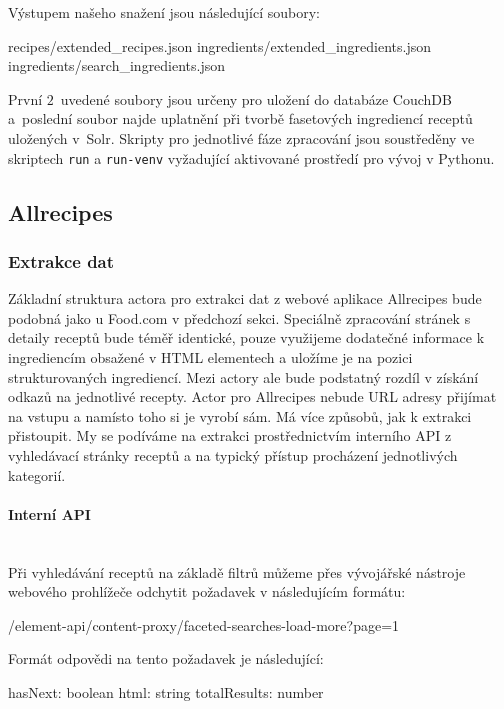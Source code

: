Výstupem našeho snažení jsou následující soubory:

\begin{code}
recipes/extended_recipes.json
ingredients/extended_ingredients.json
ingredients/search_ingredients.json
\end{code}

První $2$~uvedené soubory jsou určeny pro uložení do databáze CouchDB a~poslední soubor najde uplatnění při tvorbě fasetových ingrediencí receptů uložených v~Solr. Skripty pro jednotlivé fáze zpracování jsou soustředěny ve skriptech \texttt{run} a \texttt{run-venv} vyžadující aktivované prostředí pro vývoj v Pythonu.

\subsection{Allrecipes}

\subsubsection{Extrakce dat}

Základní struktura actora pro extrakci dat z webové aplikace Allrecipes bude podobná jako u Food.com v předchozí sekci. Speciálně zpracování stránek s detaily receptů bude téměř identické, pouze využijeme dodatečné informace k ingrediencím obsažené v HTML elementech a uložíme je na pozici strukturovaných ingrediencí. Mezi actory ale bude podstatný rozdíl v získání odkazů na jednotlivé recepty. Actor pro Allrecipes nebude URL adresy přijímat na vstupu a namísto toho si je vyrobí sám. Má více způsobů, jak k extrakci přistoupit. My se podíváme na extrakci prostřednictvím interního API z vyhledávací stránky receptů a na typický přístup procházení jednotlivých kategorií.

\paragraph{Interní API}\mbox{}\\

Při vyhledávání receptů na základě filtrů můžeme přes vývojářské nástroje webového prohlížeče odchytit požadavek v následujícím formátu:

\begin{code}
/element-api/content-proxy/faceted-searches-load-more?page=1
\end{code}
Formát odpovědi na tento požadavek je následující:
\begin{code}
{
    hasNext: boolean
    html: string
    totalResults: number
}
\end{code}

